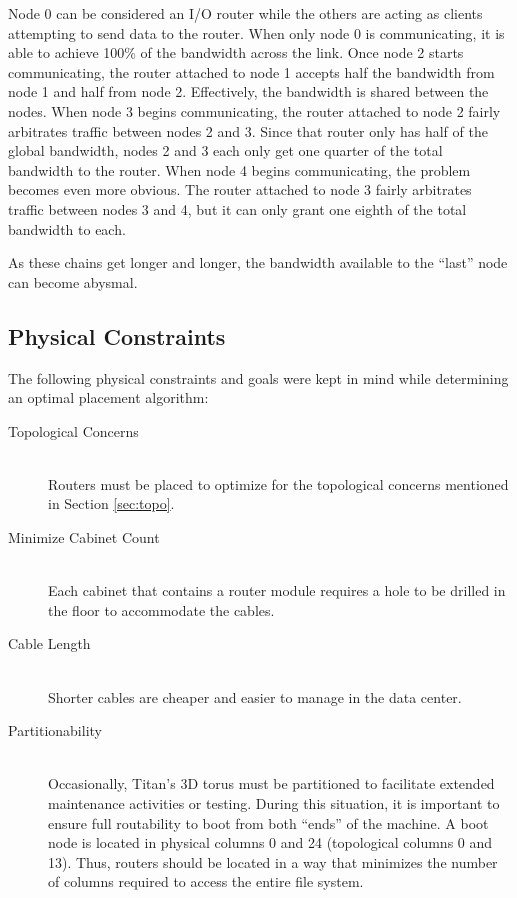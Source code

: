 Node 0 can be considered an I/O router while the others are acting as clients
attempting to send data to the router.  When only node 0 is communicating, it
is able to achieve 100\% of the bandwidth across the link.  Once node 2 starts
communicating, the router attached to node 1 accepts half the bandwidth from
node 1 and half from node 2.  Effectively, the bandwidth is shared between the
nodes.  When node 3 begins communicating, the router attached to node 2 fairly
arbitrates traffic between nodes 2 and 3.  Since that router only has half of
the global bandwidth, nodes 2 and 3 each only get one quarter of the total
bandwidth to the router.  When node 4 begins communicating, the problem becomes
even more obvious.  The router attached to node 3 fairly arbitrates traffic
between nodes 3 and 4, but it can only grant one eighth of the total bandwidth
to each.

As these chains get longer and longer, the bandwidth available to the ``last''
node can become abysmal.

\subsection{Physical Constraints}


The following physical constraints and goals were kept in mind while
determining an optimal placement algorithm:

\begin{description}
  \item[Topological Concerns] \hfill \\
    Routers must be placed to optimize for the topological concerns mentioned
    in Section \ref{sec:topo}.
  \item[Minimize Cabinet Count] \hfill \\
    Each cabinet that contains a router module requires a hole to be drilled in
    the floor to accommodate the cables.
  \item[Cable Length] \hfill \\
    Shorter cables are cheaper and easier to manage in the data center.
  \item[Partitionability] \hfill \\
    Occasionally, Titan's 3D torus must be partitioned to facilitate extended
    maintenance activities or testing.  During this situation, it is important to
    ensure full routability to boot from both ``ends'' of the machine.  A boot
    node is located in physical columns 0 and 24 (topological columns 0 and 13).
    Thus, routers should be located in a way that minimizes the number of
    columns required to access the entire file system.
\end{description}

